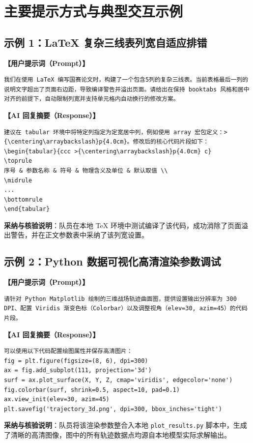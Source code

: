 \documentclass[zihao=-4,a4paper,UTF8,fontset=fandol]{ctexart}
\begin{document}
\section{主要提示方式与典型交互示例}

\subsection{示例 1：\LaTeX{} 复杂三线表列宽自适应排错}
\noindent \textbf{【用户提示词（Prompt）】}
\begin{lstlisting}
我们在使用 LaTeX 编写国赛论文时，构建了一个包含5列的复杂三线表。当前表格最后一列的说明文字超出了页面右边距，导致编译警告并溢出页面。请给出在保持 booktabs 风格和居中对齐的前提下，自动限制列宽并支持单元格内自动换行的修改方案。
\end{lstlisting}

\noindent \textbf{【AI 回复摘要（Response）】}
\begin{lstlisting}
建议在 tabular 环境中将特定列指定为定宽居中列，例如使用 array 宏包定义：>{\centering\arraybackslash}p{4.0cm}。修改后的核心代码片段如下：
\begin{tabular}{ccc >{\centering\arraybackslash}p{4.0cm} c}
\toprule
序号 & 参数名称 & 符号 & 物理含义及单位 & 默认取值 \\
\midrule
...
\bottomrule
\end{tabular}
\end{lstlisting}
\noindent \textbf{采纳与核验说明}：队员在本地 \TeX{} 环境中测试编译了该代码，成功消除了页面溢出警告，并在正文参数表中采纳了该列宽设置。

\subsection{示例 2：Python 数据可视化高清渲染参数调试}
\noindent \textbf{【用户提示词（Prompt）】}
\begin{lstlisting}
请针对 Python Matplotlib 绘制的三维战场轨迹曲面图，提供设置输出分辨率为 300 DPI、配置 Viridis 渐变色标（Colorbar）以及调整视角（elev=30, azim=45）的代码片段。
\end{lstlisting}

\noindent \textbf{【AI 回复摘要（Response）】}
\begin{lstlisting}
可以使用以下代码配置绘图属性并保存高清图片：
fig = plt.figure(figsize=(8, 6), dpi=300)
ax = fig.add_subplot(111, projection='3d')
surf = ax.plot_surface(X, Y, Z, cmap='viridis', edgecolor='none')
fig.colorbar(surf, shrink=0.5, aspect=10, pad=0.1)
ax.view_init(elev=30, azim=45)
plt.savefig('trajectory_3d.png', dpi=300, bbox_inches='tight')
\end{lstlisting}
\noindent \textbf{采纳与核验说明}：队员将该渲染参数整合入本地 \texttt{plot\_results.py} 脚本中，生成了清晰的高清图像，图中的所有轨迹数据点均源自本地模型实际求解输出。
\end{document}
